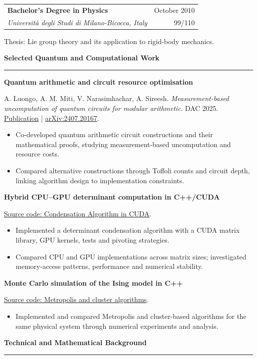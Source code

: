\documentclass[10pt,a4paper]{article}
\makeatletter
\newcommand{\cvsection}[1]{%
    \Needspace{4\baselineskip}%
    \vspace{0.8em}%
    {\large\bfseries\color{accent} #1}\par
    \vspace{0.2em}\hrule\vspace{0.45em}%
}
\newcommand{\education}[5]{%
    \Needspace{5\baselineskip}%
    \begin{tabularx}{\textwidth}{@{}>{\raggedright\arraybackslash}Xr@{}}
        \textbf{#1} & #2 \\
        \textit{#4} & #3
    \end{tabularx}\par
    #5\par\vspace{0.45em}%
}
\newcommand{\project}[3]{%
    \Needspace{5\baselineskip}%
    \textbf{#1}\par
    #2\par
    \begin{itemize}
        #3
    \end{itemize}
    \vspace{0.25em}%
}
\makeatother
\begin{document}
    \education{Bachelor's Degree in Physics}{October 2010}{99/110}
        {Universit\`a degli Studi di Milano-Bicocca, Italy}
        {Thesis: Lie group theory and its application to rigid-body mechanics.}

    \cvsection{Selected Quantum and Computational Work}

    \project{Quantum arithmetic and circuit resource optimisation}
        {A. Luongo, A. M. Miti, V. Narasimhachar, A. Sireesh.
        \emph{Measurement-based uncomputation of quantum circuits for modular
        arithmetic}. DAC 2025.
        \href{https://doi.org/10.1109/DAC63849.2025.11132981}{Publication}
        \enspace | \enspace
        \href{https://arxiv.org/abs/2407.20167}{arXiv:2407.20167}.}
        {
            \item Co-developed quantum arithmetic circuit constructions and
                their mathematical proofs, studying measurement-based
                uncomputation and resource costs.
            \item Compared alternative constructions through Toffoli counts
                and circuit depth, linking algorithm design to implementation
                constraints.
        }

    \project{Hybrid CPU--GPU determinant computation in C++/CUDA}
        {\href{https://github.com/MasterToninus/Computational-Physics-Exercise/tree/master/Condensation\%20Algorithm\%20in\%20CUDA}
        {Source code: Condensation Algorithm in CUDA}.}
        {
            \item Implemented a determinant condensation algorithm with a
                CUDA matrix library, GPU kernels, tests and pivoting strategies.
            \item Compared CPU and GPU implementations across matrix sizes;
                investigated memory-access patterns, performance and numerical
                stability.
        }

    \project{Monte Carlo simulation of the Ising model in C++}
        {\href{https://github.com/MasterToninus/Computational-Physics-Exercise/tree/master/Ising\%20simulation\%20Metropolis\%20vs\%20Cluster}
        {Source code: Metropolis and cluster algorithms}.}
        {
            \item Implemented and compared Metropolis and cluster-based
                algorithms for the same physical system through numerical
                experiments and analysis.
        }

    \cvsection{Technical and Mathematical Background}
\end{document}
